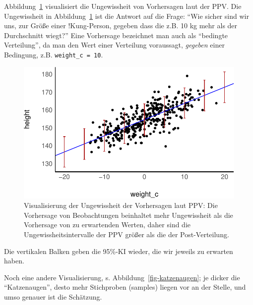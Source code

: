 \documentclass[
  a4paper,
  DIV=11]{scrreprt}
\theoremstyle{definition}
\theoremstyle{remark}
\begin{document}
Abbildung~\ref{fig-m43a-nochmal} visualisiert die Ungewissheit von
Vorhersagen laut der PPV. Die Ungewissheit in
Abbildung~\ref{fig-m43a-nochmal} ist die Antwort auf die Frage: ``Wie
sicher sind wir uns, zur Größe einer !Kung-Person, gegeben dass die z.B.
10 kg mehr als der Durchschnitt wiegt?'' Eine Vorhersage bezeichnet man
auch als ``bedingte Verteilung'', da man den Wert einer Verteilung
voraussagt, \emph{gegeben} einer Bedingung, z.B.
\texttt{weight\_c\ =\ 10}.

\begin{figure}

{\centering \includegraphics{./lineare-modelle_files/figure-pdf/fig-m43a-nochmal-1.pdf}

}

\caption{\label{fig-m43a-nochmal}Visualisierung der Ungewissheit der
Vorhersagen laut PPV: Die Vorhersage von Beobachtungen beinhaltet mehr
Ungewissheit als die Vorhersage von zu erwartenden Werten, daher sind
die Ungewissheitsintervalle der PPV größer als die der Post-Verteilung.}

\end{figure}

Die vertikalen Balken geben die 95\%-KI wieder, die wir jeweils zu
erwarten haben.

Noch eine andere Visualisierung, s. Abbildung~\ref{fig-katzenaugen}; je
dicker die ``Katzenaugen'', desto mehr Stichproben (samples) liegen vor
an der Stelle, und umso genauer ist die Schätzung.
\end{document}
